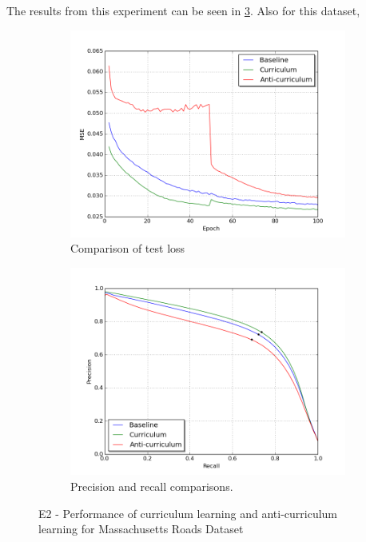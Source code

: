 The results from this experiment can be seen in \ref{fig:E2_curriculum_mass}. Also for this dataset,  \\
\begin{figure}
\begin{subfigure}{0.48\textwidth}
\includegraphics[width=\linewidth]{figs/E2/E2-lc.png}
\caption{Comparison of test loss} \label{fig:E2_curr_mass_loss}
\end{subfigure}
\hspace*{\fill} %
\begin{subfigure}{0.48\textwidth}
\includegraphics[width=\linewidth]{figs/E2/E2-pr.png}
\caption{Precision and recall comparisons.} \label{fig:E2_curr_mass_pr}
\end{subfigure}
\hspace*{\fill} %
\caption{E2 - Performance of curriculum learning and anti-curriculum learning for Massachusetts Roads Dataset} \label{fig:E2_curriculum_mass}
\end{figure}

